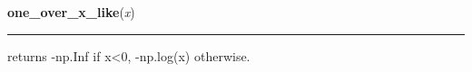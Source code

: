     \vspace{0.5ex}

\hspace{.8\funcindent}\begin{boxedminipage}{\funcwidth}

    \raggedright \textbf{one\_over\_x\_like}(\textit{x})

    \vspace{-1.5ex}

    \rule{\textwidth}{0.5\fboxrule}
\setlength{\parskip}{2ex}

returns -np.Inf if x{\textless}0, -np.log(x) otherwise.
\setlength{\parskip}{1ex}
    \end{boxedminipage}

    \label{pymc:distributions:poisson_like}

    \vspace{0.5ex}

